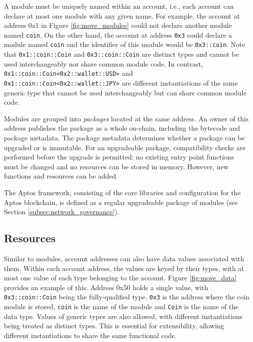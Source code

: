 \documentclass{article}
\begin{document}
A module must be uniquely named within an account, i.e., each account can declare at most one module with any given name. For example, the account at address 0x1 in Figure \ref{fig:move_modules} could not declare another module named \texttt{coin}. On the other hand, the account at address \texttt{0x3} could declare a module named \texttt{coin} and the identifier of this module would be \texttt{0x3::coin}. Note that \texttt{0x1::coin::Coin} and \texttt{0x3::coin::Coin} are distinct types and cannot be used interchangeably nor share common module code. In contrast, \texttt{0x1::coin::Coin<0x2::wallet::USD>} and \texttt{0x1::coin::Coin<0x2::wallet::JPY>} are different instantiations of the same generic type that cannot be used interchangeably but can share common module code.

Modules are grouped into \emph{packages} located at the same address. An owner of this address publishes the package as a whole on-chain, including the bytecode and package metadata. The package metadata determines whether a package can be upgraded or is immutable. For an upgradeable package, compatibility checks are performed before the upgrade is permitted: no existing entry point functions must be changed and no resources can be stored in memory. However, new functions and resources can be added. 

The Aptos framework, consisting of the core libraries and configuration for the Aptos blockchain, is defined as a regular upgradeable package of modules (see Section \ref{subsec:network_governance}).

\subsection{Resources}
\label{subsec:resources}

Similar to modules, account addresses can also have data values associated with them. Within each account address, the values are keyed by their types, with at most one value of each type belonging to the account. Figure \ref{fig:move_data} provides an example of this. Address 0x50 holds a single value, with \texttt{0x3::coin::Coin} being the fully-qualified type. \texttt{0x3} is the address where the coin module is stored, \texttt{coin} is the name of the module and \texttt{Coin} is the name of the data type. Values of generic types are also allowed, with different instantiations being treated as distinct types. This is essential for extensibility, allowing different instantiations to share the same functional code.
\end{document}
